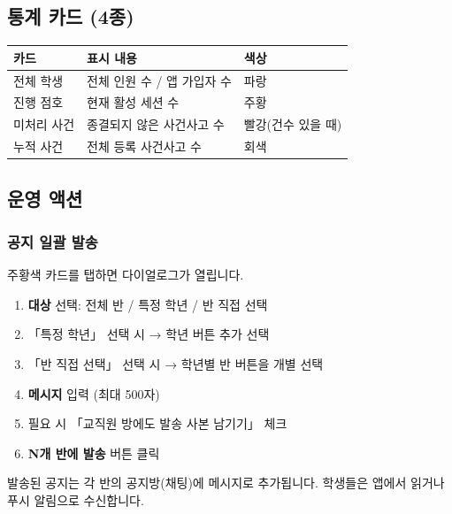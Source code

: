 \documentclass[a4paper,11pt]{article}
\begin{document}
\subsection{통계 카드 (4종)}

\begin{center}
\begin{tabular}{@{}lll@{}}
  \toprule
  \textbf{카드} & \textbf{표시 내용} & \textbf{색상} \\
  \midrule
  전체 학생 & 전체 인원 수 / 앱 가입자 수 & 파랑 \\
  진행 점호 & 현재 활성 세션 수 & 주황 \\
  미처리 사건 & 종결되지 않은 사건사고 수 & 빨강(건수 있을 때) \\
  누적 사건 & 전체 등록 사건사고 수 & 회색 \\
  \bottomrule
\end{tabular}
\end{center}

\subsection{운영 액션}

\subsubsection{공지 일괄 발송}

주황색 카드를 탭하면 다이얼로그가 열립니다.

\begin{tcolorbox}[stepbox]
\begin{enumerate}
  \item \textbf{대상} 선택: 전체 반 / 특정 학년 / 반 직접 선택
  \item 「특정 학년」 선택 시 → 학년 버튼 추가 선택
  \item 「반 직접 선택」 선택 시 → 학년별 반 버튼을 개별 선택
  \item \textbf{메시지} 입력 (최대 500자)
  \item 필요 시 「교직원 방에도 발송 사본 남기기」 체크
  \item \textbf{N개 반에 발송} 버튼 클릭
\end{enumerate}
\end{tcolorbox}

\begin{tcolorbox}[tipbox]
발송된 공지는 각 반의 공지방(채팅)에 메시지로 추가됩니다.
학생들은 앱에서 읽거나 푸시 알림으로 수신합니다.
\end{tcolorbox}
\end{document}
